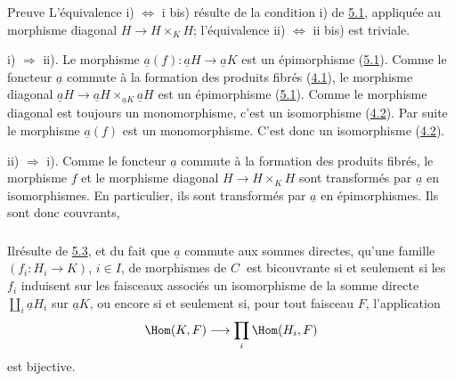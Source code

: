 \begin{enonce*}[remark]{Preuve}
L'équivalence i) $\Leftrightarrow$ i bis) résulte de la
condition i) de \hyperref[II.prop5.1]{5.1}, appliquée au morphisme diagonal
$H\rightarrow H\times_K H$; l'équivalence ii) $\Leftrightarrow$ ii
bis) est triviale.

\noindent i) $\Rightarrow$ ii). Le morphisme
$\underline{a}(f):\underline{a}H\rightarrow \underline{a}K$ est un
épimorphisme (\hyperref[II.prop5.1]{5.1}). Comme le foncteur $\underline{a}$
commute à la formation des produits fibrés (\hyperref[II.theo4.1]{4.1}), le
morphisme diagonal $\underline{a}H\rightarrow
\underline{a}H\times_{\underline{a}K}\underline{a}H$ est un épimorphisme
(\hyperref[II.prop5.1]{5.1}). Comme le morphisme diagonal est toujours un
monomorphisme, c'est un isomorphisme (\hyperref[II.prop4.2]{4.2}). Par suite
le morphisme $\underline{a}(f)$ est un monomorphisme. C'est donc un
isomorphisme (\hyperref[II.prop4.2]{4.2}).

\noindent ii) $\Rightarrow$ i). Comme le foncteur $\underline{a}$
commute à la formation des produits fibrés, le morphisme $f$ et le
morphisme diagonal $H\rightarrow H\times_K H$ sont transformés par
$\underline{a}$ en isomorphismes. En particulier, ils sont transformés
par $\underline{a}$ en épimorphismes. Ils sont donc couvrants, \cqfd
\end{enonce*}

\setcounter{subsection}{3} \setcounter{subsubsection}{0}
\subsubsection{}
Il\pageoriginale résulte de \hyperref[II.prop5.3]{5.3}, et du fait que
$\underline{a}$ commute aux sommes directes, qu'une famille
$(f_i:H_i\rightarrow K)$, $i\in I$, de morphismes de
$C^{\widehat{\phantom{,}}}$ est bicouvrante si et seulement si les
$f_i$ induisent sur les faisceaux associés un isomorphisme de la
somme directe $\amalg_i \underline{a}H_i$ sur $\underline{a}K$, ou encore si
et seulement si, pour tout faisceau $F$, l'application
$$
\Hom(K,F)\longrightarrow \prod_i \Hom(H_i,F)
$$
est bijective.

